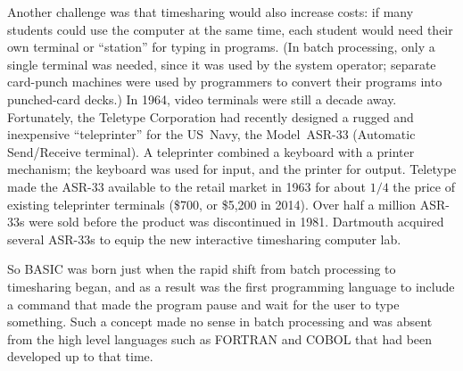 
Another challenge was that timesharing would also increase costs:
if many students could use the computer at the same time, each student
would need their own terminal or ``station'' for typing in programs.  (In batch
processing, only a single terminal was needed, since it was used by the
system operator; separate card-punch machines were used by programmers
to convert their programs into punched-card decks.)
In 1964, video terminals were still a decade away.
Fortunately, the Teletype Corporation had recently designed a rugged and
inexpensive ``teleprinter'' for the US~Navy, the Model~ASR-33 (Automatic
Send/Receive terminal).  A teleprinter combined a keyboard with a
printer mechanism; the keyboard was used for input, and the printer for
output. 
Teletype made the ASR-33
available to the retail market in 1963 for about $1/4$ the price of
existing teleprinter terminals (\$700, or \$5,200
in 2014).
Over
half a million ASR-33s were sold before the product was discontinued in 1981.
Dartmouth acquired several ASR-33s to equip the new interactive
timesharing computer lab.

So BASIC was born just when the rapid shift from batch processing to
timesharing began, and as a result
was the first programming language to include a command that made
the program pause and wait for the user to type
something.  Such a concept made no sense in batch processing and was
absent from the high level languages such as FORTRAN and COBOL that had
been developed up to that time.
 
